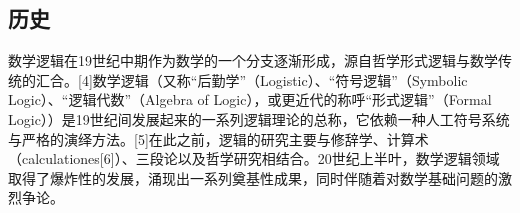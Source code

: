\subsection{历史}
数学逻辑在19世纪中期作为数学的一个分支逐渐形成，源自哲学形式逻辑与数学传统的汇合。[4]数学逻辑（又称“后勤学”（Logistic）、“符号逻辑”（Symbolic Logic）、“逻辑代数”（Algebra of Logic），或更近代的称呼“形式逻辑”（Formal Logic））是19世纪间发展起来的一系列逻辑理论的总称，它依赖一种人工符号系统与严格的演绎方法。[5]在此之前，逻辑的研究主要与修辞学、计算术（calculationes[6]）、三段论以及哲学研究相结合。20世纪上半叶，数学逻辑领域取得了爆炸性的发展，涌现出一系列奠基性成果，同时伴随着对数学基础问题的激烈争论。
